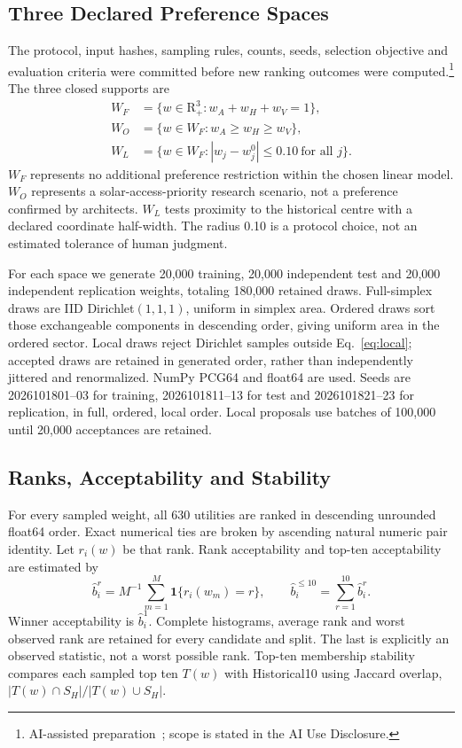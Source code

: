 \documentclass{llncs}
\newcommand{\ind}{\mathbf{1}}
\newcommand{\aidraft}{\footnote{AI-assisted preparation~\cite{openai2026}; scope is stated in the AI Use Disclosure.}}
\begin{document}
\subsection{Three Declared Preference Spaces}
The protocol, input hashes, sampling rules, counts, seeds, selection objective and evaluation criteria were committed before new ranking outcomes were computed.\aidraft{} The three closed supports are
\begin{align}
 W_F&=\{w\in\mathrm{R}_+^3:w_A+w_H+w_V=1\},\label{eq:full}\\
 W_O&=\{w\in W_F:w_A\geq w_H\geq w_V\},\label{eq:ordered}\\
 W_L&=\{w\in W_F:|w_j-w_j^0|\leq0.10\ \text{for all }j\}.\label{eq:local}
\end{align}
$W_F$ represents no additional preference restriction within the chosen linear model. $W_O$ represents a solar-access-priority research scenario, not a preference confirmed by architects. $W_L$ tests proximity to the historical centre with a declared coordinate half-width. The radius 0.10 is a protocol choice, not an estimated tolerance of human judgment.

For each space we generate 20,000 training, 20,000 independent test and 20,000 independent replication weights, totaling 180,000 retained draws. Full-simplex draws are IID Dirichlet$(1,1,1)$, uniform in simplex area. Ordered draws sort those exchangeable components in descending order, giving uniform area in the ordered sector. Local draws reject Dirichlet samples outside Eq.~\ref{eq:local}; accepted draws are retained in generated order, rather than independently jittered and renormalized. NumPy PCG64 and float64 are used. Seeds are 2026101801--03 for training, 2026101811--13 for test and 2026101821--23 for replication, in full, ordered, local order. Local proposals use batches of 100,000 until 20,000 acceptances are retained.

\subsection{Ranks, Acceptability and Stability}
For every sampled weight, all 630 utilities are ranked in descending unrounded float64 order. Exact numerical ties are broken by ascending natural numeric pair identity. Let $r_i(w)$ be that rank. Rank acceptability and top-ten acceptability are estimated by
\begin{equation}
 \widehat b_i^r=M^{-1}\sum_{m=1}^M\ind\{r_i(w_m)=r\},\qquad
 \widehat b_i^{\leq10}=\sum_{r=1}^{10}\widehat b_i^r.
\label{eq:acceptability}
\end{equation}
Winner acceptability is $\widehat b_i^1$. Complete histograms, average rank and worst observed rank are retained for every candidate and split. The last is explicitly an observed statistic, not a worst possible rank. Top-ten membership stability compares each sampled top ten $T(w)$ with Historical10 using Jaccard overlap, $|T(w)\cap S_H|/|T(w)\cup S_H|$.
\end{document}
